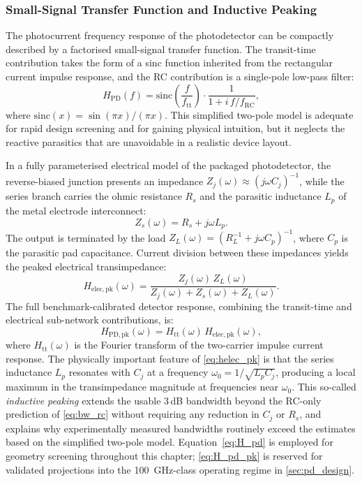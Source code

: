 \subsubsection{Small-Signal Transfer Function and Inductive Peaking}

The photocurrent frequency response of the photodetector can be compactly
described by a factorised small-signal transfer function. The transit-time
contribution takes the form of a sinc function inherited from the rectangular
current impulse response, and the RC contribution is a single-pole low-pass
filter:
\begin{equation}
    H_{\mathrm{PD}}(f)
    = \mathrm{sinc}\!\left(\frac{f}{f_{\mathrm{tt}}}\right)
    \cdot\frac{1}{1 + i\,f/f_{\mathrm{RC}}},
    \label{eq:H_pd}
\end{equation}
where $\mathrm{sinc}(x) = \sin(\pi x)/(\pi x)$. This simplified two-pole model
is adequate for rapid design screening and for gaining physical intuition, but
it neglects the reactive parasitics that are unavoidable in a realistic device
layout.

In a fully parameterised electrical model of the packaged photodetector, the
reverse-biased junction presents an impedance $Z_j(\omega) \approx (j\omega C_j)^{-1}$,
while the series branch carries the ohmic resistance $R_s$ and the parasitic
inductance $L_p$ of the metal electrode interconnect:
\begin{equation}
    Z_s(\omega) = R_s + j\omega L_p.
    \label{eq:zs}
\end{equation}
The output is terminated by the load $Z_L(\omega) = (R_L^{-1} + j\omega C_p)^{-1}$,
where $C_p$ is the parasitic pad capacitance. Current division between these
impedances yields the peaked electrical transimpedance:
\begin{equation}
    H_{\mathrm{elec,pk}}(\omega)
    = \frac{Z_j(\omega)\,Z_L(\omega)}
           {Z_j(\omega)+Z_s(\omega)+Z_L(\omega)}.
    \label{eq:helec_pk}
\end{equation}
The full benchmark-calibrated detector response, combining the transit-time
and electrical sub-network contributions, is:
\begin{equation}
    H_{\mathrm{PD,pk}}(\omega)
    = H_{\mathrm{tt}}(\omega)\,H_{\mathrm{elec,pk}}(\omega),
    \label{eq:H_pd_pk}
\end{equation}
where $H_{\mathrm{tt}}(\omega)$ is the Fourier transform of the two-carrier
impulse current response. The physically important feature of
\cref{eq:helec_pk} is that the series inductance $L_p$ resonates with $C_j$
at a frequency $\omega_0 = 1/\sqrt{L_p C_j}$, producing a local maximum in the
transimpedance magnitude at frequencies near $\omega_0$. This so-called
\emph{inductive peaking} extends the usable \mbox{3\,dB} bandwidth beyond the
RC-only prediction of \cref{eq:bw_rc} without requiring any reduction in $C_j$
or $R_s$, and explains why experimentally measured bandwidths routinely exceed
the estimates based on the simplified two-pole model. Equation~\cref{eq:H_pd}
is employed for geometry screening throughout this chapter; \cref{eq:H_pd_pk}
is reserved for validated projections into the \SI{100}{\giga\hertz}-class
operating regime in \cref{sec:pd_design}.

